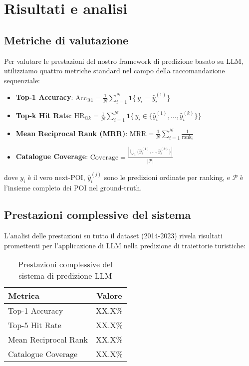 \chapter{Risultati e analisi}

\section{Metriche di valutazione}

Per valutare le prestazioni del nostro framework di predizione basato su LLM, utilizziamo quattro metriche standard nel campo della raccomandazione sequenziale:

\begin{itemize}
\item \textbf{Top-1 Accuracy}: $\text{Acc}_{@1}=\frac{1}{N}\sum_{i=1}^{N}\mathbf{1}\{\,y_i=\hat{y}_i^{(1)}\}$
\item \textbf{Top-k Hit Rate}: $\text{HR}_{@k}=\frac{1}{N}\sum_{i=1}^{N}\mathbf{1}\{\,y_i\in\{\hat{y}_i^{(1)},\dots,\hat{y}_i^{(k)}\}\}$
\item \textbf{Mean Reciprocal Rank (MRR)}: $\text{MRR}=\frac{1}{N}\sum_{i=1}^{N}\frac{1}{\text{rank}_i}$
\item \textbf{Catalogue Coverage}: $\text{Coverage}=\frac{|\bigcup_{i}\{\hat{y}_i^{(1)},\dots,\hat{y}_i^{(k)}\}|}{|\mathcal{P}|}$
\end{itemize}

dove $y_i$ è il vero next-POI, $\hat{y}_i^{(j)}$ sono le predizioni ordinate per ranking, e $\mathcal{P}$ è l'insieme completo dei POI nel ground-truth.

\section{Prestazioni complessive del sistema}

L'analisi delle prestazioni su tutto il dataset (2014-2023) rivela risultati promettenti per l'applicazione di LLM nella predizione di traiettorie turistiche:

\begin{table}[H]
\centering
\caption{Prestazioni complessive del sistema di predizione LLM}
\label{tab:overall_performance}
\begin{tabular}{@{}lc@{}}
\toprule
Metrica & Valore \\
\midrule
Top-1 Accuracy & XX.X\% \\
Top-5 Hit Rate & XX.X\% \\
Mean Reciprocal Rank & XX.X\% \\
Catalogue Coverage & XX.X\% \\
\bottomrule
\end{tabular}
\end{table}

